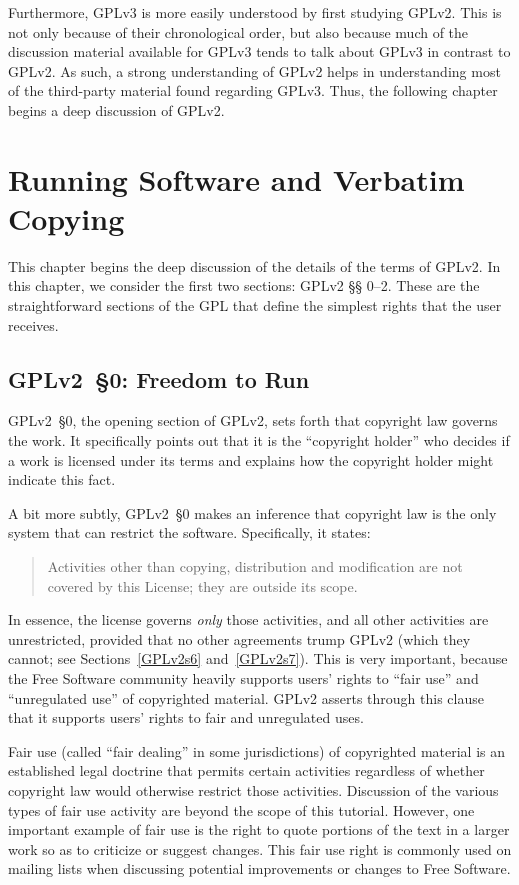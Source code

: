 Furthermore, GPLv3 is more easily understood by first studying GPLv2.
This is not only because of their chronological order, but also because much
of the discussion material available for GPLv3 tends to talk about GPLv3 in
contrast to GPLv2.  As such, a strong understanding of GPLv2 helps in
understanding most of the third-party material found regarding GPLv3.  Thus,
the following chapter begins a deep discussion of GPLv2.

\chapter{Running Software and Verbatim Copying}
\label{run-and-verbatim}


This chapter begins the deep discussion of the details of the terms of
GPLv2\@. In this chapter, we consider the first two sections: GPLv2 \S\S
0--2. These are the straightforward sections of the GPL that define the
simplest rights that the user receives.

\section{GPLv2~\S0: Freedom to Run}
\label{GPLv2s0}

GPLv2~\S0, the opening section of GPLv2, sets forth that copyright law governs
the work.  It specifically points out that it is the ``copyright
holder'' who decides if a work is licensed under its terms and explains
how the copyright holder might indicate this fact.

A bit more subtly, GPLv2~\S0 makes an inference that copyright law is the only
system that can restrict the software.  Specifically, it states:
\begin{quote}
Activities other than copying, distribution and modification are not
covered by this License; they are outside its scope.
\end{quote}
In essence, the license governs \emph{only} those activities, and all other
activities are unrestricted, provided that no other agreements trump GPLv2
(which they cannot; see Sections~\ref{GPLv2s6} and~\ref{GPLv2s7}).  This is
very important, because the Free Software community heavily supports
users' rights to ``fair use'' and ``unregulated use'' of copyrighted
material.  GPLv2 asserts through this clause that it supports users' rights
to fair and unregulated uses.

Fair use (called ``fair dealing'' in some jurisdictions) of copyrighted
material is an established legal doctrine that permits certain activities
regardless of whether copyright law would otherwise restrict those activities.
Discussion of the various types of fair use activity are beyond the scope of
this tutorial.  However, one important example of fair use is the right to
quote portions of the text in a larger work so as to criticize or suggest
changes.  This fair use right is commonly used on mailing lists when
discussing potential improvements or changes to Free Software.

